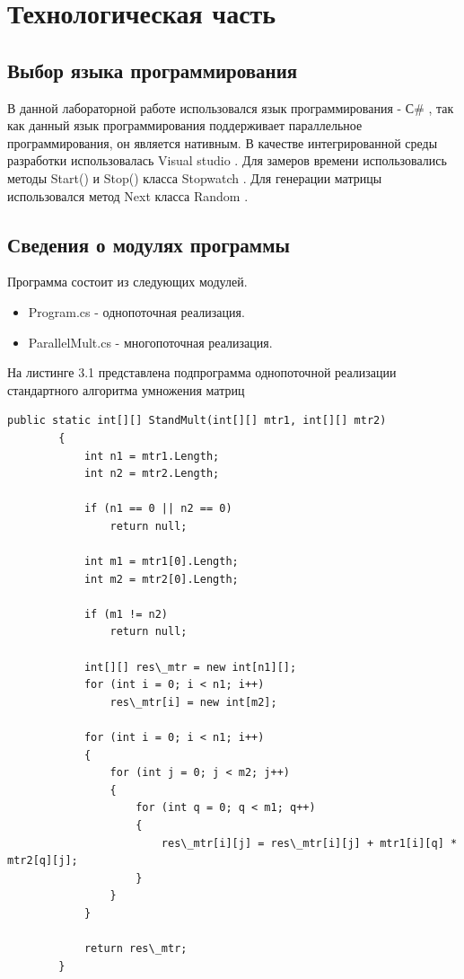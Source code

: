 \documentclass[12pt]{report}
\begin{document}
\chapter{Технологическая часть}
\section{Выбор языка программирования}
В данной лабораторной работе использовался язык программирования - С\# \cite{C}, так как данный язык программирования поддерживает параллельное программирования, он является нативным. В качестве интегрированной среды разработки использовалась Visual studio  \cite{Vs}. Для замеров времени использовались методы Start() и Stop() класса Stopwatch \cite{Stopwatch}.  Для генерации матрицы использовался метод Next класса Random \cite{Rand}.

\section{Сведения о модулях программы}
Программа состоит из следующих модулей.
\begin{itemize}
	\item Program.cs - однопоточная реализация.
	\item ParallelMult.cs - многопоточная реализация.
\end{itemize}

На листинге 3.1 представлена подпрограмма однопоточной реализации стандартного алгоритма умножения матриц
\begin{lstlisting}[label=some-code,caption=Подпрограмма однопоточной реализации стандартного алгоритма умножения матриц]
public static int[][] StandMult(int[][] mtr1, int[][] mtr2)
        {
            int n1 = mtr1.Length;
            int n2 = mtr2.Length;

            if (n1 == 0 || n2 == 0)
                return null;

            int m1 = mtr1[0].Length;
            int m2 = mtr2[0].Length;

            if (m1 != n2)
                return null;

            int[][] res\_mtr = new int[n1][];
            for (int i = 0; i < n1; i++)
                res\_mtr[i] = new int[m2];

            for (int i = 0; i < n1; i++)
            {
                for (int j = 0; j < m2; j++)
                {
                    for (int q = 0; q < m1; q++)
                    {
                        res\_mtr[i][j] = res\_mtr[i][j] + mtr1[i][q] * mtr2[q][j];
                    }
                }
            }

            return res\_mtr;
        }\end{lstlisting}
\end{document}

